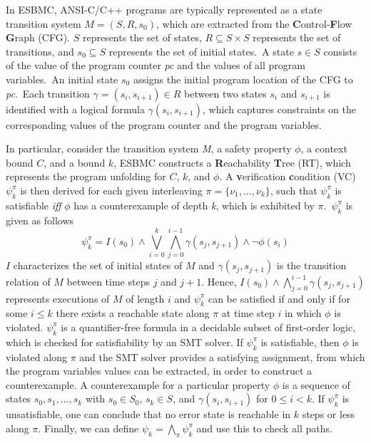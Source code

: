 \documentclass[times, doublespace]{cpeauth}
\begin{document}
In ESBMC, ANSI-C/C++ programs are typically represented as a state transition system $M = (S, R, s_{0})$, which are extracted from the \textbf{C}ontrol-\textbf{F}low \textbf{G}raph (CFG). $S$ represents the set of states, $R \subseteq S \times S$ represents the set of transitions, and $s_{0} \subseteq S$ represents the set of initial states.\ A state $s \in S$ consists of the value  of the program counter \emph{pc} and the values of all program variables.\ An initial state $s_{0}$ assigns the initial program location of the CFG to \emph{pc}.\ Each transition $\gamma=(s_i,s_{i+1}) \in R$ between two states $s_{i}$ and $s_{i+1}$ is identified with a logical formula $\gamma(s_i,s_{i+1})$, which captures constraints on the corresponding values of the program counter and the program variables.

In particular, consider the transition system \textit{M}, a safety property $\phi$, a context bound $C$, and a bound $k$, ESBMC constructs a \textbf{R}eachability \textbf{T}ree (RT), which represents the program unfolding for $C$, $k$, and $\phi$. A \textbf{v}erification \textbf{c}ondition (VC) $\psi^{\pi}_{k}$ is then derived for each given interleaving $\pi = \{\nu_1,\ldots, \nu_k\}$, such that $\psi^{\pi}_{k}$ is satisfiable \textit{iff} $\phi$ has a counterexample of depth \textit{k}, which is exhibited by $\pi$.\ $\psi^{\pi}_{k}$ is given as follows
%
\begin{equation} \label{bounded-model-checking} \psi^{\pi}_{k} =
I(s_{0}) 
\wedge 
  \bigvee^{k}_{i=0} \bigwedge^{i-1}_{j=0} \gamma(s_{j},s_{j+1})
\wedge 
  \neg \phi(s_i)
\end{equation}
%
\noindent $I$ characterizes the set of initial states of $M$ and $\gamma(s_{j},s_{j+1})$ is the transition relation of $M$ between time steps $j$ and $j+1$. Hence, $I(s_0)\wedge\bigwedge^{i-1}_{j=0} \gamma(s_{j},s_{j+1})$ represents executions of $M$ of length $i$ and $\psi^{\pi}_{k}$ can be satisfied if and only if for some $i \leq k$ there exists a reachable state along $\pi$ at time step $i$ in which $\phi$ is violated. $\psi^{\pi}_{k}$ is a quantifier-free formula in a decidable subset of first-order logic, which is checked for satisfiability by an SMT solver. If $\psi^{\pi}_{k}$ is satisfiable, then $\phi$ is violated along $\pi$ and the SMT solver provides a satisfying assignment, from which the  program variables values can be extracted, in order to construct a counterexample. A counterexample for a particular property $\phi$ is a sequence of states $s_{0}, s_{1},\ldots, s_{k}$ with $s_{0} \in S_{0}$, $s_{k} \in S$, and $\gamma\left(s_{i}, s_{i+1}\right)$ for $0 \leq i < k$. If $\psi^{\pi}_{k}$ is unsatisfiable, one can conclude that no error state is reachable in $k$ steps or less along $\pi$. Finally, we can define $\psi_{k} = \bigwedge_{\pi}\psi^{\pi}_{k}$ and use this to check all paths. 
\end{document}
